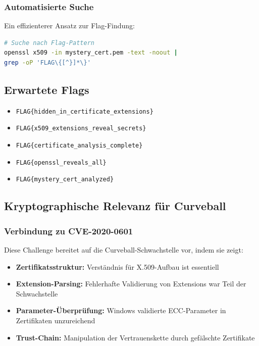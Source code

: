 \documentclass{article}
\begin{document}
\subsubsection{Automatisierte Suche}
Ein effizienterer Ansatz zur Flag-Findung:

\begin{lstlisting}[language=bash,caption={Automatisierte Flag-Suche}]
# Suche nach Flag-Pattern
openssl x509 -in mystery_cert.pem -text -noout | 
grep -oP 'FLAG\{[^}]*\}'
\end{lstlisting}

\subsection{Erwartete Flags}

\begin{itemize}
    \item \texttt{FLAG\{hidden\_in\_certificate\_extensions\}}
    \item \texttt{FLAG\{x509\_extensions\_reveal\_secrets\}}
    \item \texttt{FLAG\{certificate\_analysis\_complete\}}
    \item \texttt{FLAG\{openssl\_reveals\_all\}}
    \item \texttt{FLAG\{mystery\_cert\_analyzed\}}
\end{itemize}

\subsection{Kryptographische Relevanz für Curveball}

\subsubsection{Verbindung zu CVE-2020-0601}
Diese Challenge bereitet auf die Curveball-Schwachstelle vor, indem sie zeigt:

\begin{itemize}
    \item \textbf{Zertifikatsstruktur:} Verständnis für X.509-Aufbau ist essentiell
    \item \textbf{Extension-Parsing:} Fehlerhafte Validierung von Extensions war Teil der Schwachstelle
    \item \textbf{Parameter-Überprüfung:} Windows validierte ECC-Parameter in Zertifikaten unzureichend
    \item \textbf{Trust-Chain:} Manipulation der Vertrauenskette durch gefälschte Zertifikate
\end{itemize}
\end{document}
